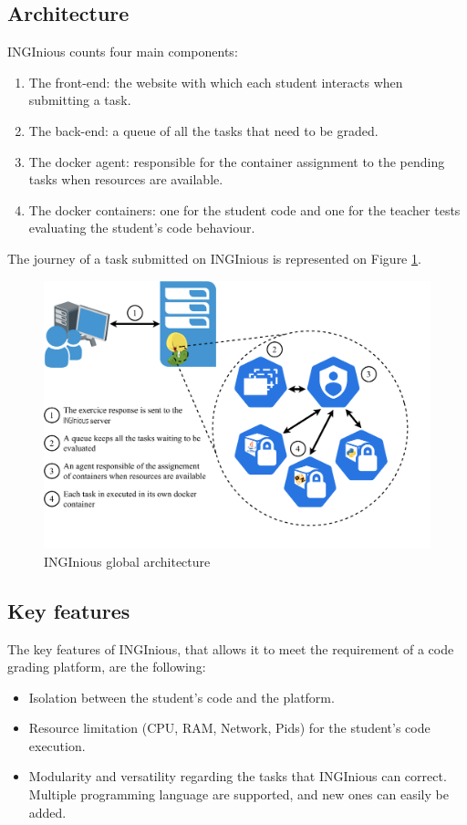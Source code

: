 \subsection{Architecture}
INGInious counts four main components:
\begin{enumerate}
  \item The front-end: the website with which each student interacts when submitting a task.
  \item The back-end: a queue of all the tasks that need to be graded.
  \item The docker agent: responsible for the container assignment to the pending tasks when resources are available.
  \item The docker containers: one for the student code and one for the teacher tests evaluating the student's code behaviour.
\end{enumerate}
The journey of a task submitted on INGInious is represented on Figure \ref{fig:architecture}.
\begin{figure}[!h]
  \begin{center}
    \includegraphics[width=\linewidth]{images/Architecture.pdf}
    \caption{INGInious global architecture}
    \label{fig:architecture}
  \end{center}
\end{figure}

\subsection{Key features}
The key features of INGInious, that allows it to meet the requirement of a code grading platform, are the following:
\begin{itemize}
  \item Isolation between the student's code and the platform.
  \item Resource limitation (CPU, RAM, Network, Pids) for the student's code execution.
  \item Modularity and versatility regarding the tasks that INGInious can correct.  Multiple programming language are supported, and new ones can easily be added.
\end{itemize}

